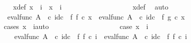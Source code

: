 \begin{isabellebody}
\ \ \ \ \ \ \ \ \ \ \ \ \ \ \ \ \isamarkupfalse%
\ \isamarkupfalse%
\ x{\isacharunderscore}{\kern0pt}def{}{\isacharcolon}{\kern0pt}\ {\isachardoublequoteopen}{\isacharparenleft}{\kern0pt}x\ {\isacharequal}{\kern0pt}\ {\isasymlangle}{\isasymf}{\isacharcomma}{\kern0pt}i{\isasymrangle}{\isacharparenright}{\kern0pt}\ {\isasymor}\ {\isacharparenleft}{\kern0pt}x\ {\isacharequal}{\kern0pt}\ {\isasymlangle}{\isasymt}{\isacharcomma}{\kern0pt}i{\isasymrangle}{\isacharparenright}{\kern0pt}{\isachardoublequoteclose}\isanewline
\ \ \ \ \ \ \ \ \ \ \ \ \ \ \ \ \ \ \isamarkupfalse%
\ x{\isacharunderscore}{\kern0pt}def\ \isamarkupfalse%
\ auto\isanewline
\ \ \ \ \ \ \ \ \ \ \ \ \ \ \ \ \isamarkupfalse%
\ {\isachardoublequoteopen}{\isacharparenleft}{\kern0pt}eval{\isacharunderscore}{\kern0pt}func\ A\ {\isasymOmega}\ {\isasymcirc}\isactrlsub c\ id\isactrlsub c\ {\isasymOmega}\ {\isasymtimes}\isactrlsub f\ f{\isacharparenright}{\kern0pt}\ {\isasymcirc}\isactrlsub c\ x\ {\isacharequal}{\kern0pt}\ {\isacharparenleft}{\kern0pt}eval{\isacharunderscore}{\kern0pt}func\ A\ {\isasymOmega}\ {\isasymcirc}\isactrlsub c\ id\isactrlsub c\ {\isasymOmega}\ {\isasymtimes}\isactrlsub f\ g{\isacharparenright}{\kern0pt}\ {\isasymcirc}\isactrlsub c\ x{\isachardoublequoteclose}\isanewline
\ \ \ \ \ \ \ \ \ \ \ \ \ \ \ \ \isamarkupfalse%
{\isacharparenleft}{\kern0pt}cases\ {\isachardoublequoteopen}{\isacharparenleft}{\kern0pt}x\ {\isacharequal}{\kern0pt}\ {\isasymlangle}{\isasymf}{\isacharcomma}{\kern0pt}i{\isasymrangle}{\isacharparenright}{\kern0pt}{\isachardoublequoteclose}{\isacharcomma}{\kern0pt}auto{\isacharparenright}{\kern0pt}\isanewline
\ \ \ \ \ \ \ \ \ \ \ \ \ \ \ \ \ \ \isamarkupfalse%
\ case{}{\isacharcolon}{\kern0pt}\ {\isachardoublequoteopen}x\ {\isacharequal}{\kern0pt}\ {\isasymlangle}{\isasymf}{\isacharcomma}{\kern0pt}i{\isasymrangle}{\isachardoublequoteclose}\isanewline
\ \ \ \ \ \ \ \ \ \ \ \ \ \ \ \ \ \ \isamarkupfalse%
\ {\isachardoublequoteopen}{\isacharparenleft}{\kern0pt}eval{\isacharunderscore}{\kern0pt}func\ A\ {\isasymOmega}\ {\isasymcirc}\isactrlsub c\ {\isacharparenleft}{\kern0pt}id\isactrlsub c\ {\isasymOmega}\ {\isasymtimes}\isactrlsub f\ f{\isacharparenright}{\kern0pt}{\isacharparenright}{\kern0pt}\ {\isasymcirc}\isactrlsub c\ {\isasymlangle}{\isasymf}{\isacharcomma}{\kern0pt}i{\isasymrangle}\ {\isacharequal}{\kern0pt}\ eval{\isacharunderscore}{\kern0pt}func\ A\ {\isasymOmega}\ {\isasymcirc}\isactrlsub c\ {\isacharparenleft}{\kern0pt}{\isacharparenleft}{\kern0pt}id\isactrlsub c\ {\isasymOmega}\ {\isasymtimes}\isactrlsub f\ f{\isacharparenright}{\kern0pt}\ {\isasymcirc}\isactrlsub c\ {\isasymlangle}{\isasymf}{\isacharcomma}{\kern0pt}i{\isasymrangle}{\isacharparenright}{\kern0pt}{\isachardoublequoteclose}\isanewline

\end{isabellebody}
